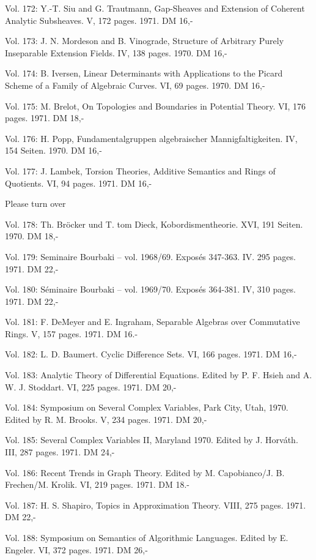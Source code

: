 Vol. 172: Y.-T. Siu and G. Trautmann, Gap-Sheaves and Extension of Coherent Analytic Subsheaves. V, 172 pages. 1971. DM 16,-

Vol. 173: J. N. Mordeson and B. Vinograde, Structure of Arbitrary Purely Inseparable Extension Fields. IV, 138 pages. 1970. DM 16,-

Vol. 174: B. Iversen, Linear Determinants with Applications to the Picard Scheme of a Family of Algebraic Curves. VI, 69 pages. 1970. DM 16,-

Vol. 175: M. Brelot, On Topologies and Boundaries in Potential Theory. VI, 176 pages. 1971. DM 18,-

Vol. 176: H. Popp, Fundamentalgruppen algebraischer Mannigfaltigkeiten. IV, 154 Seiten. 1970. DM 16,-

Vol. 177: J. Lambek, Torsion Theories, Additive Semantics and Rings of Quotients. VI, 94 pages. 1971. DM 16,-

Please turn over



Vol. 178: Th. Bröcker und T. tom Dieck, Kobordismentheorie. XVI, 191 Seiten. 1970. DM 18,-

Vol. 179: Seminaire Bourbaki -- vol. 1968/69. Exposés 347-363. IV. 295 pages. 1971. DM 22,-

Vol. 180: Séminaire Bourbaki -- vol. 1969/70. Exposés 364-381. IV, 310 pages. 1971. DM 22,-

Vol. 181: F. DeMeyer and E. Ingraham, Separable Algebras over Commutative Rings. V, 157 pages. 1971. DM 16.-

Vol. 182: L. D. Baumert. Cyclic Difference Sets. VI, 166 pages. 1971. DM 16,-

Vol. 183: Analytic Theory of Differential Equations. Edited by P. F. Hsieh and A. W. J. Stoddart. VI, 225 pages. 1971. DM 20,-

Vol. 184: Symposium on Several Complex Variables, Park City, Utah, 1970. Edited by R. M. Brooks. V, 234 pages. 1971. DM 20,-

Vol. 185: Several Complex Variables II, Maryland 1970. Edited by J. Horváth. III, 287 pages. 1971. DM 24,-

Vol. 186: Recent Trends in Graph Theory. Edited by M. Capobianco/J. B. Frechen/M. Krolik. VI, 219 pages. 1971. DM 18.-

Vol. 187: H. S. Shapiro, Topics in Approximation Theory. VIII, 275 pages. 1971. DM 22,-

Vol. 188: Symposium on Semantics of Algorithmic Languages. Edited by E. Engeler. VI, 372 pages. 1971. DM 26,-

